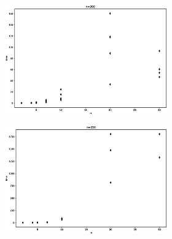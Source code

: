 \begin{figure}[h!]
\begin{subfigure}[b]{\textwidth}
\begin{subfigure}[b]{0.32\textwidth}
	     \end{subfigure}
	     \hspace{0em}
	     \begin{subfigure}[b]{0.32\textwidth}
	         \includegraphics[width=\columnwidth]{images/bagm2.eps}
	     \end{subfigure}
	  \end{subfigure}
	  \begin{subfigure}[b]{\textwidth}
	  	\centering
	      \begin{subfigure}[b]{0.32\textwidth}
	         \includegraphics[width=\columnwidth]{images/bagm3.eps}
	     \end{subfigure}
	     \hspace{0em}
	      \begin{subfigure}[b]{0.32\textwidth}

\end{subfigure}
\end{subfigure}
\end{figure}
